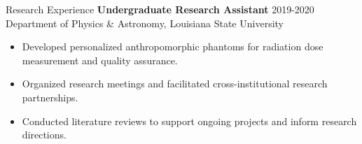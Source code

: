 \documentclass[
	11pt, %
]{resume} %
\begin{document}
\begin{rSection}{Research Experience}
\newpage
	\textbf{Undergraduate Research Assistant} \hfill 2019-2020 \\
	Department of Physics \& Astronomy, Louisiana State University
	\vspace{-.2cm}
	\begin{itemize}[label=$\cdot$]
		\itemsep-0.5em
		\item Developed personalized anthropomorphic phantoms for radiation dose measurement and quality assurance.
		\item Organized research meetings and facilitated cross-institutional research partnerships.
		\item Conducted literature reviews to support ongoing projects and inform research directions.
	\end{itemize}

\end{rSection}
\vspace{0.5cm}

\end{document}
